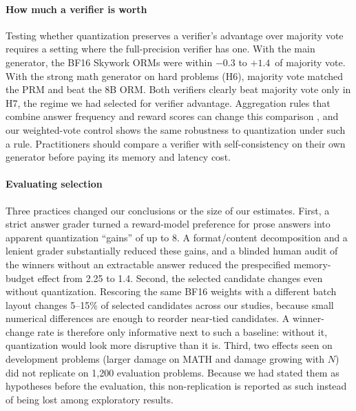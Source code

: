 \paragraph{How much a verifier is worth} Testing whether quantization preserves a
verifier's advantage over majority vote requires a setting where the full-precision
verifier has one. With the main generator, the BF16 Skywork ORMs were within $-0.3$ to
$+1.4$\pp\ of majority vote. With the strong math generator on hard problems (H6),
majority vote matched the PRM and beat the 8B ORM. Both verifiers clearly beat majority
vote only in H7, the regime we had selected for verifier advantage. Aggregation rules
that combine answer frequency and reward scores can change this comparison
\cite{kuang2025aggregation}, and our weighted-vote control shows the same robustness to
quantization under such a rule. Practitioners should compare a verifier with
self-consistency on their own generator before paying its memory and latency cost.

\paragraph{Evaluating selection} Three practices changed our conclusions or the size of
our estimates. First, a strict answer grader turned a reward-model preference for prose
answers into apparent quantization ``gains'' of up to 8\pp. A format/content
decomposition and a lenient grader substantially reduced these gains, and a blinded
human audit of the winners without an extractable answer reduced the prespecified
memory-budget effect from 2.25 to 1.4\pp. Second, the selected candidate changes even without
quantization. Rescoring the same BF16 weights with a different batch layout changes
5--15\% of selected candidates across our studies, because small numerical differences
are enough to reorder near-tied candidates. A winner-change rate is therefore only
informative next to such a baseline: without it, quantization would look more
disruptive than it is. Third, two effects seen on development problems (larger
damage on MATH and damage growing with $N$) did not replicate on 1,200 evaluation
problems. Because we had stated them as hypotheses before the evaluation, this
non-replication is reported as such instead of being lost among exploratory
results.

